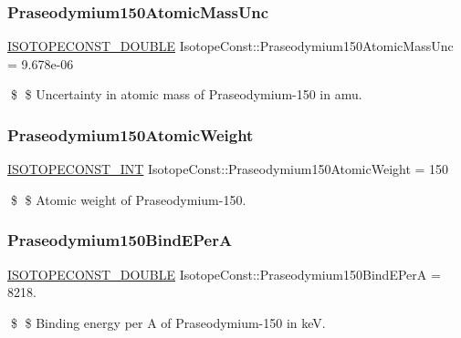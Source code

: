 \subsubsection{\texorpdfstring{Praseodymium150\+Atomic\+Mass\+Unc}{Praseodymium150AtomicMassUnc}}
{\footnotesize\ttfamily \mbox{\hyperlink{group___isotope_const-_macros_ga8f45a7272ce02c0b4c65c44636ed719a}{I\+S\+O\+T\+O\+P\+E\+C\+O\+N\+S\+T\+\_\+\+D\+O\+U\+B\+LE}} Isotope\+Const\+::\+Praseodymium150\+Atomic\+Mass\+Unc = 9.\+678e-\/06}

\$ \$ Uncertainty in atomic mass of Praseodymium-\/150 in amu. \mbox{\label{group___isotope_const-_praseodymium-_pr150_gae18653aa7c9126e4473e90d2b91e099b}} 
\subsubsection{\texorpdfstring{Praseodymium150\+Atomic\+Weight}{Praseodymium150AtomicWeight}}
{\footnotesize\ttfamily \mbox{\hyperlink{group___isotope_const-_macros_ga5f18360b3e99483a35c32d789e62621c}{I\+S\+O\+T\+O\+P\+E\+C\+O\+N\+S\+T\+\_\+\+I\+NT}} Isotope\+Const\+::\+Praseodymium150\+Atomic\+Weight = 150}

\$ \$ Atomic weight of Praseodymium-\/150. \mbox{\label{group___isotope_const-_praseodymium-_pr150_gaab1d3f04b1fc808bada614ed9a28cc65}} 
\subsubsection{\texorpdfstring{Praseodymium150\+Bind\+E\+PerA}{Praseodymium150BindEPerA}}
{\footnotesize\ttfamily \mbox{\hyperlink{group___isotope_const-_macros_ga8f45a7272ce02c0b4c65c44636ed719a}{I\+S\+O\+T\+O\+P\+E\+C\+O\+N\+S\+T\+\_\+\+D\+O\+U\+B\+LE}} Isotope\+Const\+::\+Praseodymium150\+Bind\+E\+PerA = 8218.}

\$ \$ Binding energy per A of Praseodymium-\/150 in keV. \mbox{\label{group___isotope_const-_praseodymium-_pr150_ga85bf1223d50ae6cd027b661ba9347dbb}} 
